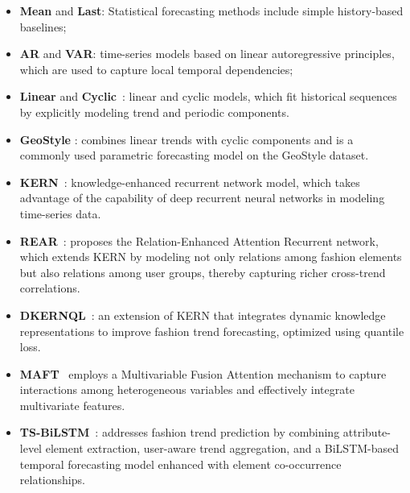 \documentclass[Afour,sageh,times]{sagej}
\begin{document}
{\begin{itemize}
\item  \textbf{Mean} and \textbf{Last}: Statistical forecasting methods include simple history-based baselines;
\item  \textbf{AR} and \textbf{VAR}: time-series models based on linear autoregressive principles, which are used to capture local temporal dependencies;


\item \textbf{Linear} and \textbf{Cyclic}~\cite{mall2019geostyle}: linear and cyclic models, which fit historical sequences by explicitly modeling trend and periodic components.

\item \textbf{GeoStyle} \cite{mall2019geostyle}: combines linear trends with cyclic components and is a commonly used parametric forecasting model on the GeoStyle dataset.

\item \textbf{KERN}~\cite{ma2020knowledge}: knowledge-enhanced recurrent network model, which takes advantage of the capability of deep recurrent neural networks in modeling time-series data.

\item \textbf{REAR}~\cite{ding2021leveraging}: proposes the Relation-Enhanced Attention Recurrent network, which extends KERN by modeling not only relations among fashion elements but also relations among user groups, thereby capturing richer cross-trend correlations.

\item \textbf{DKERNQL}~\cite{rooholamini2023dynamic}: an extension of KERN that integrates dynamic knowledge representations to improve fashion trend forecasting, optimized using quantile loss.

\item \textbf{MAFT}~\cite{chen2023fashion} employs a Multivariable Fusion Attention mechanism to capture interactions among heterogeneous variables and effectively integrate multivariate features.

\item \textbf{TS-BiLSTM}~\cite{huang2024application}: addresses fashion trend prediction by combining attribute-level element extraction, user-aware trend aggregation, and a BiLSTM-based temporal forecasting model enhanced with element co-occurrence relationships.


\end{itemize}}
\end{document}
